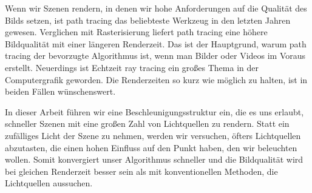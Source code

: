 
\Abstract

Wenn wir Szenen rendern, in denen wir hohe Anforderungen auf die Qualität des Bilds setzen, ist path tracing das beliebteste Werkzeug in den letzten Jahren gewesen. Verglichen mit Rasterisierung liefert path tracing eine höhere Bildqualität mit einer längeren Renderzeit. Das ist der Hauptgrund, warum path tracing der bevorzugte Algorithmus ist, wenn man Bilder oder Videos im Voraus erstellt. Neuerdings ist Echtzeit ray tracing ein großes Thema in der Computergrafik geworden. Die Renderzeiten so kurz wie möglich zu halten, ist in beiden Fällen wünschenswert.

In dieser Arbeit führen wir eine Beschleunigungsstruktur ein, die es uns erlaubt, schneller Szenen mit eine großen Zahl von Lichtquellen zu rendern. Statt ein zufälliges Licht der Szene zu nehmen, werden wir versuchen, öfters Lichtquellen abzutasten, die einen hohen Einfluss auf den Punkt haben, den wir beleuchten wollen. Somit konvergiert unser Algorithmus schneller und die Bildqualität wird bei gleichen Renderzeit besser sein als mit konventionellen Methoden, die Lichtquellen aussuchen.